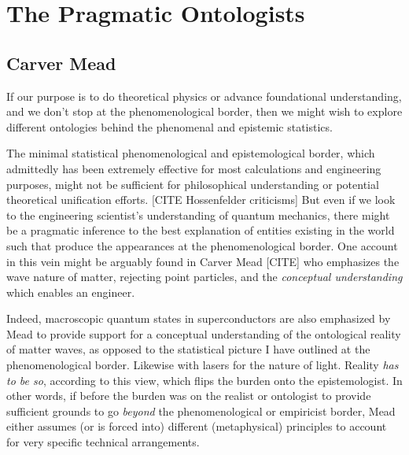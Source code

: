 \documentclass{article}
\begin{document}
    


\section{The Pragmatic Ontologists}

\subsection{Carver Mead}

If our purpose is to do theoretical physics or advance foundational understanding, and we don't stop at the phenomenological border, then we might wish to explore different ontologies behind the phenomenal and epistemic statistics. 

The minimal statistical phenomenological and epistemological border, which admittedly has been extremely effective for most calculations and engineering purposes, might not be sufficient for philosophical understanding or potential theoretical unification efforts. [CITE  Hossenfelder criticisms]  But even if we look to the engineering scientist's understanding of quantum mechanics, there might be a pragmatic inference to the best explanation of entities existing in the world such that produce the appearances at the phenomenological border.  One account in this vein might be arguably found in Carver Mead [CITE] who emphasizes the wave nature of matter, rejecting point particles, and the \emph{conceptual understanding} which enables an engineer.

Indeed, macroscopic quantum states in superconductors are also emphasized by Mead to provide support for a conceptual understanding of the ontological reality of matter waves, as opposed to the statistical picture I have outlined at the phenomenological border.  Likewise with lasers for the nature of light.  Reality \emph{has to be so}, according to this view, which flips the burden onto the epistemologist.  In other words, if before the burden was on the realist or ontologist to provide sufficient grounds to go \emph{beyond} the phenomenological or empiricist border, Mead either assumes (or is forced into) different (metaphysical) principles to account for very specific technical arrangements.  
\end{document}
